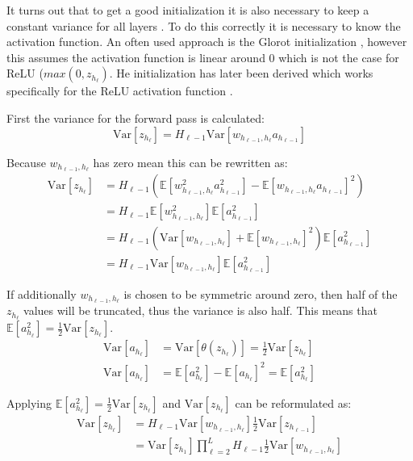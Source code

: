 It turns out that to get a good initialization it is also necessary to keep a constant variance for all layers \cite{glorot-initialization, he-initialization}. To do this correctly it is necessary to know the activation function. An often used approach is the Glorot initialization \cite{glorot-initialization}, however this assumes the activation function is linear around $0$ which is not the case for ReLU ($max(0, z_{h_{\ell}})$. He initialization has later been derived which works specifically for the ReLU activation function \cite{he-initialization}.

First the variance for the forward pass is calculated:
\begin{equation}
\mathrm{Var}[z_{h_\ell}] = H_{\ell-1} \mathrm{Var}[w_{h_{\ell-1}, h_{\ell}} a_{h_{\ell-1}}]
\end{equation}

Because $w_{h_{\ell-1}, h_{\ell}}$ has zero mean this can be rewritten as:
\begin{equation}
\begin{aligned}
\mathrm{Var}[z_{h_\ell}]
&= H_{\ell-1} \left( \mathbb{E}[w_{h_{\ell-1}, h_{\ell}}^2 a_{h_{\ell-1}}^2] - \mathbb{E}[w_{h_{\ell-1}, h_{\ell}} a_{h_{\ell-1}}]^2 \right) \\
&= H_{\ell-1} \mathbb{E}[w_{h_{\ell-1}, h_{\ell}}^2] \mathbb{E}[a_{h_{\ell-1}}^2] \\
&= H_{\ell-1} \left(\mathrm{Var}[w_{h_{\ell-1}, h_{\ell}}] + \mathbb{E}[w_{h_{\ell-1}, h_{\ell}}]^2\right) \mathbb{E}[a_{h_{\ell-1}}^2] \\
&= H_{\ell-1} \mathrm{Var}[w_{h_{\ell-1}, h_{\ell}}] \mathbb{E}[a_{h_{\ell-1}}^2]
\end{aligned}
\end{equation}

If additionally $w_{h_{\ell-1}, h_{\ell}}$ is chosen to be symmetric around zero, then half of the $z_{h_\ell}$ values will be truncated, thus the variance is also half. This means that $\mathbb{E}[a_{h_\ell}^2] = \frac{1}{2} \mathrm{Var}[z_{h_\ell}]$.
\begin{equation}
\begin{aligned}
\mathrm{Var}[a_{h_\ell}] &= \mathrm{Var}[\theta(z_{h_\ell})] = \frac{1}{2}\mathrm{Var}[z_{h_\ell}] \\
\mathrm{Var}[a_{h_\ell}] &= \mathbb{E}[a_{h_\ell}^2] -\mathbb{E}[a_{h_\ell}]^2 = \mathbb{E}[a_{h_\ell}^2]
\end{aligned}
\end{equation}

Applying $\mathbb{E}[a_{h_\ell}^2] = \frac{1}{2} \mathrm{Var}[z_{h_\ell}]$ and $\mathrm{Var}[z_{h_\ell}]$  can be reformulated as:
\begin{equation}
\begin{aligned}
\mathrm{Var}[z_{h_\ell}] &= H_{\ell-1} \mathrm{Var}[w_{h_{\ell-1}, h_{\ell}}] \frac{1}{2} \mathrm{Var}[z_{h_{\ell-1}}] \\
&= \mathrm{Var}[z_{h_1}] \prod_{\ell=2}^L H_{\ell-1} \frac{1}{2} \mathrm{Var}[w_{h_{\ell-1}, h_{\ell}}]
\end{aligned}
\label{eq:theory:optimize:he-all-var}
\end{equation}

